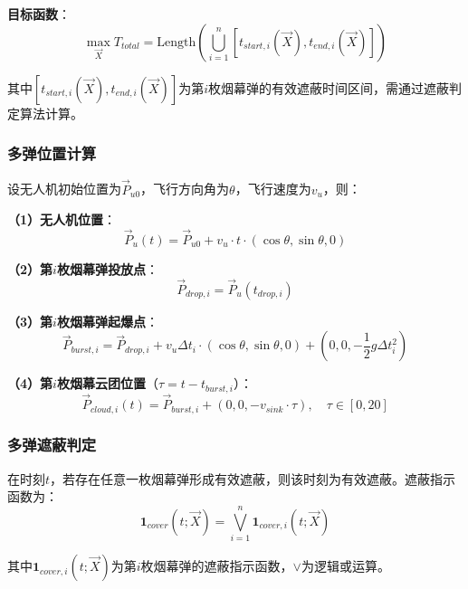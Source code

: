 \documentclass[12pt,a4paper]{article}
\begin{document}
\noindent\textbf{目标函数}：
\begin{equation}
\max_{\vec{X}} T_{total} = \text{Length}\left(\bigcup_{i=1}^{n} [t_{start,i}(\vec{X}), t_{end,i}(\vec{X})]\right)
\end{equation}

\indent 其中$[t_{start,i}(\vec{X}), t_{end,i}(\vec{X})]$为第$i$枚烟幕弹的有效遮蔽时间区间，需通过遮蔽判定算法计算。

\subsubsection{多弹位置计算}

\indent 设无人机初始位置为$\vec{P}_{u0}$，飞行方向角为$\theta$，飞行速度为$v_u$，则：

\noindent\textbf{（1）无人机位置}：
\begin{equation}
\vec{P}_u(t) = \vec{P}_{u0} + v_u \cdot t \cdot (\cos\theta, \sin\theta, 0)
\end{equation}

\noindent\textbf{（2）第$i$枚烟幕弹投放点}：
\begin{equation}
\vec{P}_{drop,i} = \vec{P}_u(t_{drop,i})
\end{equation}

\noindent\textbf{（3）第$i$枚烟幕弹起爆点}：
\begin{equation}
\vec{P}_{burst,i} = \vec{P}_{drop,i} + v_u \Delta t_i \cdot (\cos\theta, \sin\theta, 0) + (0, 0, -\frac{1}{2}g\Delta t_i^2)
\end{equation}

\noindent\textbf{（4）第$i$枚烟幕云团位置}（$\tau = t - t_{burst,i}$）：
\begin{equation}
\vec{P}_{cloud,i}(t) = \vec{P}_{burst,i} + (0, 0, -v_{sink} \cdot \tau), \quad \tau \in [0, 20]
\end{equation}

\subsubsection{多弹遮蔽判定}

\indent 在时刻$t$，若存在任意一枚烟幕弹形成有效遮蔽，则该时刻为有效遮蔽。遮蔽指示函数为：
\begin{equation}
\mathbf{1}_{cover}(t; \vec{X}) = \bigvee_{i=1}^{n} \mathbf{1}_{cover,i}(t; \vec{X})
\end{equation}

\indent 其中$\mathbf{1}_{cover,i}(t; \vec{X})$为第$i$枚烟幕弹的遮蔽指示函数，$\vee$为逻辑或运算。
\end{document}
